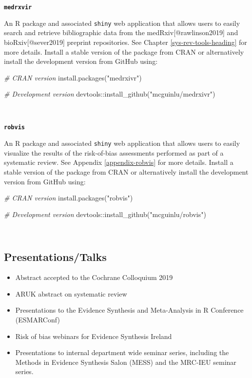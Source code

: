 \documentclass[a4paper,nobind]{templates/ociamthesis}
\providecommand{\tightlist}{%
  \setlength{\itemsep}{0pt}\setlength{\parskip}{0pt}}
\newenvironment{Shaded}{\begin{snugshade}}{\end{snugshade}}
\newcommand{\CommentTok}[1]{\textcolor[rgb]{0.56,0.35,0.01}{\textit{#1}}}
\newcommand{\FunctionTok}[1]{\textcolor[rgb]{0.00,0.00,0.00}{#1}}
\newcommand{\NormalTok}[1]{#1}
\newcommand{\SpecialCharTok}[1]{\textcolor[rgb]{0.00,0.00,0.00}{#1}}
\newcommand{\StringTok}[1]{\textcolor[rgb]{0.31,0.60,0.02}{#1}}
\renewenvironment{Shaded}
{
  \vspace{4pt}%
  \begin{snugshade}%
}{%
  \end{snugshade}%
  \vspace{4pt}%
}
\begin{document}
\textbf{\texttt{medrxvir}}

An R package and associated \texttt{shiny} web application that allows users to easily search and retrieve bibliographic data from the medRxiv{[}@rawlinson2019{]} and bioRxiv{[}@sever2019{]} preprint repositories. See Chapter \ref{sys-rev-tools-heading} for more details. Install a stable version of the package from CRAN or alternatively install the development version from GitHub using:

\begin{Shaded}
\begin{Highlighting}[]
\CommentTok{\# CRAN version}
\FunctionTok{install.packages}\NormalTok{(}\StringTok{"medrxivr"}\NormalTok{)}

\CommentTok{\# Development version}
\NormalTok{devtools}\SpecialCharTok{::}\FunctionTok{install\_github}\NormalTok{(}\StringTok{"mcguinlu/medrxivr"}\NormalTok{)}
\end{Highlighting}
\end{Shaded}

~

\textbf{\texttt{robvis}}

An R package and associated \texttt{shiny} web application that allows users to easily visualize the results of the risk-of-bias assessments performed as part of a systematic review. See Appendix \ref{appendix-robvis} for more details. Install a stable version of the package from CRAN or alternatively install the development version from GitHub using:

\begin{Shaded}
\begin{Highlighting}[]
\CommentTok{\# CRAN version}
\FunctionTok{install.packages}\NormalTok{(}\StringTok{"robvis"}\NormalTok{)}

\CommentTok{\# Development version}
\NormalTok{devtools}\SpecialCharTok{::}\FunctionTok{install\_github}\NormalTok{(}\StringTok{"mcguinlu/robvis"}\NormalTok{)}
\end{Highlighting}
\end{Shaded}

~

\hypertarget{presentationstalks}{%
\subsection{Presentations/Talks}\label{presentationstalks}}

\begin{itemize}
\tightlist
\item
  Abstract accepted to the Cochrane Colloquium 2019
\item
  ARUK abstract on systematic review
\item
  Presentations to the Evidence Synthesis and Meta-Analysis in R Conference (ESMARConf)
\item
  Risk of bias webinars for Evidence Synthesis Ireland
\item
  Presentations to internal department wide seminar series, including the Methods in Evidence Synthesis Salon (MESS) and the MRC-IEU seminar series.
\end{itemize}
\end{document}
